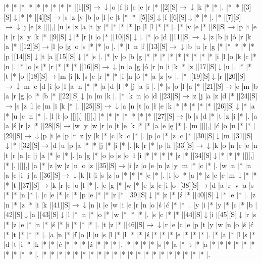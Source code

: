 \documentclass[11pt]{article}
\newcommand\drarr{$\rightarrow \!\!\!\!\! \downarrow$}
\newcommand\rarr{$\rightarrow$}
\newcommand\darr{$\downarrow$}
\begin{document}
\noindent\begin{Puzzle}{20}{31}|*	|*	|*	|*	|*	|*	|*	|*	|*	|[1][S]\drarr	|o	|f	|i	|c	|e	|r	|*	|[2][S]\drarr	|k	|*	|*	|.
|*	|*	|[3][S]\darr	|*	|*	|[4][S]\rarr	|s	|z	|y	|b	|o	|l	|e	|t	|*	|*	|[5][S]\darr	|f	|[6][S]\darr	|*	|*	|.
|*	|[7][S]\drarr	|j	|e	|ż	|[][,]{ }	|u	|s	|z	|a	|t	|y	|*	|*	|*	|*	|p	|l	|l	|*	|*	|.
|*	|v	|e	|*	|[8][S]\rarr	|p	|i	|e	|t	|r	|z	|y	|k	|*	|[9][S]\darr	|*	|r	|i	|o	|*	|[10][S]\darr	|.
|*	|o	|d	|[11][S]\drarr	|z	|b	|i	|ó	|r	|k	|a	|*	|[12][S]\rarr	|l	|o	|g	|o	|s	|*	|*	|o	|.
|*	|l	|n	|f	|[13][S]\drarr	|b	|u	|r	|g	|*	|*	|*	|*	|*	|p	|[14][S]\darr	|t	|a	|[15][S]\darr	|*	|s	|.
|*	|v	|o	|b	|g	|*	|*	|*	|*	|*	|*	|*	|*	|*	|i	|l	|o	|k	|c	|*	|n	|.
|*	|o	|s	|*	|r	|*	|*	|*	|[16][S]\drarr	|n	|a	|g	|ó	|r	|n	|i	|k	|*	|z	|[17][S]\darr	|u	|.
|*	|*	|t	|*	|o	|[18][S]\rarr	|m	|i	|k	|s	|e	|r	|*	|*	|i	|n	|ó	|*	|a	|z	|w	|.
|*	|[19][S]\darr	|r	|[20][S]\drarr	|m	|e	|d	|i	|o	|l	|a	|n	|*	|*	|a	|d	|ł	|*	|j	|a	|i	|.
|*	|s	|o	|l	|a	|*	|[21][S]\rarr	|e	|m	|b	|a	|r	|g	|o	|*	|b	|*	|[22][S]\darr	|n	|m	|k	|.
|*	|k	|n	|o	|d	|[23][S]\rarr	|z	|j	|a	|z	|d	|*	|[24][S]\rarr	|s	|z	|l	|e	|m	|i	|k	|*	|.
|[25][S]\drarr	|a	|n	|t	|a	|ł	|e	|k	|*	|*	|*	|*	|*	|[26][S]\darr	|*	|a	|*	|u	|c	|n	|*	|.
|l	|ł	|o	|[][,]{ }	|[][,]{ }	|*	|*	|*	|*	|*	|*	|*	|[27][S]\rarr	|b	|s	|d	|*	|t	|z	|i	|*	|.
|a	|a	|ś	|r	|z	|*	|[28][S]\rarr	|w	|y	|w	|r	|o	|t	|e	|k	|*	|*	|a	|e	|ę	|*	|.
|m	|[][,]{ }	|ć	|o	|u	|*	|*	|[29][S]\drarr	|p	|i	|e	|p	|r	|z	|y	|k	|*	|c	|k	|c	|*	|.
|p	|o	|*	|z	|c	|*	|[30][S]\darr	|m	|[31][S]\darr	|*	|[32][S]\rarr	|d	|u	|p	|a	|*	|*	|j	|*	|i	|*	|.
|k	|r	|*	|p	|h	|[33][S]\drarr	|k	|o	|n	|c	|e	|n	|t	|r	|a	|c	|j	|a	|*	|e	|*	|.
|a	|g	|*	|o	|o	|s	|o	|ł	|i	|*	|*	|*	|*	|z	|*	|[34][S]\darr	|*	|*	|*	|[][,]{ }	|*	|.
|[][,]{ }	|a	|*	|z	|w	|z	|n	|o	|z	|[35][S]\rarr	|i	|z	|o	|e	|n	|z	|y	|m	|*	|c	|*	|.
|w	|n	|*	|n	|a	|c	|i	|j	|a	|[36][S]\drarr	|k	|l	|i	|s	|z	|a	|*	|*	|*	|e	|*	|.
|i	|o	|*	|a	|*	|z	|c	|e	|m	|l	|*	|*	|*	|t	|[37][S]\rarr	|k	|r	|e	|o	|l	|*	|.
|e	|g	|*	|w	|*	|e	|z	|c	|i	|o	|[38][S]\rarr	|d	|a	|r	|v	|a	|s	|*	|*	|n	|*	|.
|c	|e	|*	|c	|*	|p	|e	|*	|*	|r	|*	|[39][S]\darr	|*	|z	|*	|ź	|*	|[40][S]\darr	|*	|e	|*	|.
|z	|n	|*	|z	|*	|i	|k	|[41][S]\drarr	|n	|i	|e	|w	|i	|e	|r	|n	|o	|ś	|ć	|*	|*	|.
|y	|i	|*	|y	|*	|c	|*	|b	|[42][S]\darr	|a	|[43][S]\darr	|l	|*	|n	|*	|o	|*	|w	|*	|*	|*	|.
|s	|c	|*	|*	|[44][S]\darr	|i	|[45][S]\darr	|r	|s	|*	|ż	|e	|*	|n	|*	|ś	|*	|i	|*	|*	|*	|.
|t	|z	|*	|[46][S]\drarr	|r	|e	|c	|e	|p	|t	|y	|w	|n	|o	|ś	|ć	|*	|t	|*	|*	|*	|.
|a	|n	|*	|f	|o	|l	|u	|s	|l	|*	|ł	|*	|*	|ś	|*	|*	|*	|e	|*	|*	|*	|.
|*	|a	|*	|l	|s	|*	|d	|t	|i	|*	|k	|*	|*	|ć	|*	|*	|*	|ź	|*	|*	|*	|.
|*	|*	|*	|*	|s	|*	|a	|*	|t	|*	|a	|*	|*	|*	|*	|*	|*	|*	|*	|*	|*	|.
|*	|*	|*	|*	|*	|*	|*	|*	|*	|*	|*	|*	|*	|*	|*	|*	|*	|*	|*	|*	|*	|.\end{Puzzle}
\end{document}
